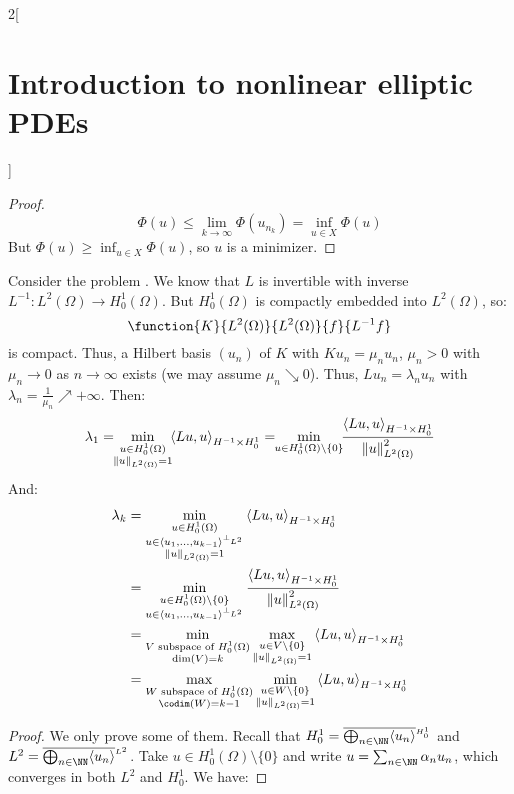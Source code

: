 \documentclass[../../../main_math.tex]{subfiles}
\begin{document}
\begin{multicols}{2}[\section{Introduction to nonlinear elliptic PDEs}]
\begin{proof}
    $$
      \Phi(u)\leq \lim_{k\to\infty}\Phi(u_{n_k})=\inf_{u\in X}\Phi(u)
    $$
    But $\displaystyle\Phi(u)\geq \inf_{u\in X}\Phi(u)$, so $u$ is a minimizer.
  \end{proof}
  \begin{theorem}
    Consider the problem . We know that $L$ is invertible with inverse $L^{-1}:L^2(\Omega)\to H_0^1(\Omega)$. But $H_0^1(\Omega)$ is compactly embedded into $L^2(\Omega)$, so:
    $$
      \function{K}{L^2(\Omega)}{L^2(\Omega)}{f}{L^{-1}f}
    $$
    is compact. Thus, a Hilbert basis $(u_n)$ of $K$ with $Ku_n=\mu_n u_n$, $\mu_n>0$ with $\mu_n\to 0$ as $n\to\infty$ exists (we may assume $\mu_n\searrow 0$). Thus, $Lu_n=\lambda_nu_n$ with $\lambda_n=\frac{1}{\mu_n}\nearrow+\infty$. Then:
    $$
      \lambda_1=\!\!\min_{\substack{u\in H_0^1(\Omega) \\ \norm{u}_{L^2(\Omega)}=1}}\!\!{\langle Lu,u\rangle}_{H^{-1}\times H_0^1}=\!\!\min_{u\in H_0^1(\Omega)\setminus\{0\}}\!\!\frac{{\langle Lu,u\rangle}_{H^{-1}\times H_0^1}}{\norm{u}_{L^2(\Omega)}^2}
    $$
    And:
    \begin{align*}
      \lambda_k & =\min_{\substack{u\in H_0^1(\Omega)                   \\u\in\langle u_1,\dots,u_{k-1}\rangle^{\perp_{L^2}}\\ \norm{u}_{L^2(\Omega)}=1}}{\langle Lu,u\rangle}_{H^{-1}\times H_0^1}\\
                & = \min_{\substack{u\in H_0^1(\Omega)\setminus\{0\}    \\ u\in\langle u_1,\dots,u_{k-1}\rangle^{\perp_{L^2}}}}\frac{{\langle Lu,u\rangle}_{H^{-1}\times H_0^1}}{\norm{u}_{L^2(\Omega)}^2}\\
                & =\min_{\substack{V\text{ subspace of }H_0^1(\Omega)   \\ \dim(V)=k}}\max_{\substack{u\in V\setminus\{0\} \\ \norm{u}_{L^2(\Omega)}=1}}{\langle Lu,u\rangle}_{H^{-1}\times H_0^1}\\
                & = \max_{\substack{W\text{ subspace of } H_0^1(\Omega) \\ \codim(W)=k-1}}\min_{\substack{u\in W\setminus\{0\} \\ \norm{u}_{L^2(\Omega)}=1}}{\langle Lu,u\rangle}_{H^{-1}\times H_0^1}
    \end{align*}
  \end{theorem}
  \begin{proof}
    We only prove some of them.
    Recall that $H_0^1=\overline{\bigoplus_{n\in\NN} \langle u_n\rangle}^{{}_{H_0^1}}$ and $L^2=\overline{\bigoplus_{n\in\NN} \langle u_n\rangle}^{{}_{L^2}}$. Take $u\in H_0^1(\Omega)\setminus\{0\}$ and write $u=\sum_{n\in\NN}\alpha_n u_n$, which converges in both $L^2$ and $H_0^1$. We have:

\end{proof}
\end{multicols}
\end{document}
